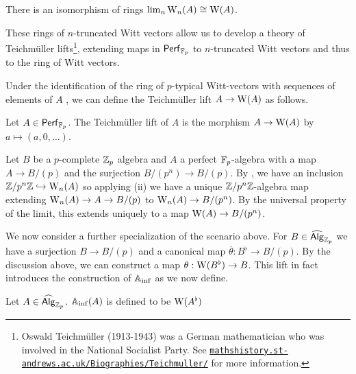 \begin{remark}
    There is an isomorphism of rings $\lim_{n}\mathrm{W}_{n}(A)\cong\mathrm{W}(A)$. 
\end{remark}
These rings of $n$-truncated Witt vectors allow us to develop a theory of Teichm\"{u}ller lifts\footnote{Oswald Teichm\"{u}ller (1913-1943) was a German mathematician who was involved in the National Socialist Party. See \href{https://mathshistory.st-andrews.ac.uk/Biographies/Teichmuller/}{\texttt{mathshistory.st-andrews.ac.uk/Biographies/Teichmuller/}} for more information.}, extending maps in $\mathsf{Perf}_{\mathbb{F}_{p}}$ to $n$-truncated Witt vectors and thus to the ring of Witt vectors. 

Under the identification of the ring of $p$-typical Witt-vectors with sequences of elements of $A$ \cite[Def. 3.1.6, 3.2.4]{Kedlaya}, we can define the Teichm\"{u}ller lift $A\to\mathrm{W}(A)$ as follows. 
\begin{definition}\label{def: Teichmuller lift}
    Let $A\in\mathsf{Perf}_{\mathbb{F}_{p}}$. The Teichm\"{u}ller lift of $A$ is the morphism $A\to\mathrm{W}(A)$ by $a\mapsto(a,0,\dots)$. 
\end{definition}

Let $B$ be a $p$-complete $\mathbb{Z}_{p}$ algebra and $A$ a perfect $\mathbb{F}_{p}$-algebra with a map $A\to B/(p)$ and the surjection $B/(p^{n})\to B/(p)$. By , we have an inclusion $\mathbb{Z}/p^{n}\mathbb{Z}\hookrightarrow\mathrm{W}_{n}(A)$ so applying  (ii) we have a unique $\mathbb{Z}/p^{n}\mathbb{Z}$-algebra map extending $\mathrm{W}_{n}(A)\to A\to B/(p)$ to $\mathrm{W}_{n}(A)\to B/(p^{n})$. By the universal property of the limit, this extends uniquely to a map $\mathrm{W}(A)\to B/(p^{n})$. 

We now consider a further specialization of the scenario above. For $B\in\widehat{\mathsf{Alg}}_{\mathbb{Z}_{p}}$ we have a surjection $B\to B/(p)$ and a canonical map $\overline{\theta}:B^{\flat}\to B/(p)$. By the discussion above, we can construct a map $\theta:\mathrm{W}(B^{\flat})\to B$. This lift in fact introduces the construction of $\A_{\inf}$ as we now define. 
\begin{definition}[$\A_{\inf}$]\label{def: Ainf}
    Let $A\in\widehat{\mathsf{Alg}}_{\mathbb{Z}_{p}}$. $\mathbb{A}_{\inf}(A)$ is defined to be $\mathrm{W}(A^{\flat})$
\end{definition}